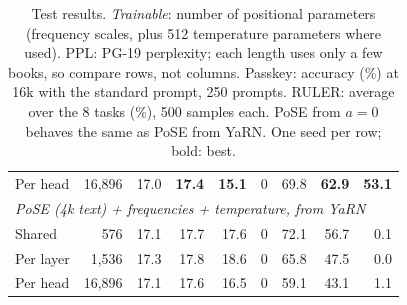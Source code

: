 \begin{table}[t]
\begin{tabular}{l r rrr r rrr}
\quad Per head    & 16,896 & 17.0 & \textbf{17.4} & \textbf{15.1} & 0 & 69.8 & \textbf{62.9} & \textbf{53.1} \\
\multicolumn{9}{l}{\textit{PoSE (4k text) + frequencies + temperature, from YaRN}} \\
\quad Shared      & 576    & 17.1 & 17.7 & 17.6 & 0 & 72.1 & 56.7 & 0.1 \\
\quad Per layer   & 1,536  & 17.3 & 17.8 & 18.6 & 0 & 65.8 & 47.5 & 0.0 \\
\quad Per head    & 16,896 & 17.1 & 17.6 & 16.5 & 0 & 59.1 & 43.1 & 1.1 \\
\bottomrule
\end{tabular}
\caption{Test results. \emph{Trainable}: number of positional parameters
(frequency scales, plus 512 temperature parameters where used).
PPL: PG-19 perplexity; each length uses only a few books, so compare rows, not
columns. Passkey: accuracy (\%) at 16k with the standard prompt, 250 prompts.
RULER: average over the 8 tasks (\%), 500 samples each.
PoSE from $a{=}0$ behaves the same as PoSE from YaRN.
One seed per row; bold: best.}
\label{tab:main}
\end{table}
